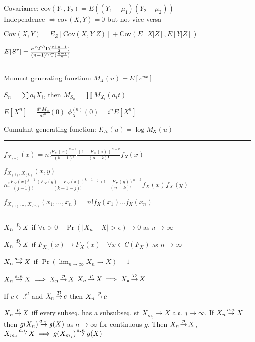 \documentclass[notitlepage,10pt,twocolumn]{article}
\newcommand\cali[1]{\ensuremath{\mathcal{#1}}}
\newcommand\reals{\ensuremath{\mathbb{R}}}
\renewcommand\top{\,{\buildrel p \over \to}\,}
\newcommand\tod{\,{\buildrel \cali{D} \over \to}\,}
\newcommand\toas{\,{\buildrel a.s. \over \to}\,}
\begin{document}
Covariance: cov$(Y_1, Y_2) = E((Y_1-\mu_1)(Y_2-\mu_2))$\\
	Independence $\Rightarrow \text{cov}(X,Y) = 0$ but not vice versa

$\text{Cov}(X,Y)=E_Z[\text{Cov}(X,Y|Z)] + \text{Cov}(E[X|Z],E[Y|Z])$

$E[S^r] = \frac{\sigma^r 2^{\sfrac{r}{2}} \Gamma(\frac{r+n-1}{2})}{(n-1)^{\sfrac{r}{2}} \Gamma(\frac{n-1}{2})}$

\vspace{.2cm} \hrule \vspace{.2cm}

Moment generating function: $M_X(u) = E[e^{ux}]$

$S_n = \sum a_i X_i$, then $M_{S_n} = \prod M_{X_i}(a_i t)$

$E[X^n] = \frac{d^n M_X}{dt^n}(0)$ \quad $\phi_X^{(n)}(0) = i^n E[X^n]$

Cumulant generating function: $K_X(u) = \log M_X(u)$

\vspace{.2cm} \hrule \vspace{.2cm}

$f_{X_{(k)}}(x) = n! \frac{F_X(x)^{k-1}}{(k-1)!} \frac{(1-F_X(x))^{n-k}}{(n-k)!}f_X(x)$

$f_{X_{(j)},X_{(k)}}(x,y) =$\\ $n! \frac{F_X(x)^{j-1}}{(j-1)!} \frac{(F_X(y)-F_X(x))^{k-1-j}}{(k-1-j)!} \frac{(1-F_X(y))^{n-k}}{(n-k)!}f_X(x)f_X(y)$

$f_{X_{(1)},\dots,X_{(n)}}(x_1,\dots,x_n) = n! f_X(x_1) \dots f_X(x_n)$

\vspace{.15cm} \hrule \vspace{.15cm}

$X_n \top X$ if $\forall \epsilon > 0 \quad \Pr(|X_n - X| > \epsilon) \to 0$ as $n \to \infty$

$X_n \tod X$ if $ F_{X_n}(x) \to F_X(x) \quad \forall x \in C(F_X)$ as $n\to \infty$

$X_n \toas X$ if $\Pr(\lim_{n\to\infty} X_n\to X) =1$

$X_n \toas X \implies X_n \top X$ \quad \quad  $X_n \top X \implies X_n \tod X$

If $c \in \reals^d$ and $X_n \tod c$ then $X_n \top c$

$X_n \top X$ iff every subseq. has a subsubseq. st $X_{m_j} \to X$ a.s. $j \to \infty$. If $X_n \toas X$ then $g(X_n) \toas g(X)$ as $n\to\infty$ for continuous $g$. Then $X_n \top X$, $X_{m_j} \toas X \implies g(X_{m_j}) \toas g(X)$
\end{document}
